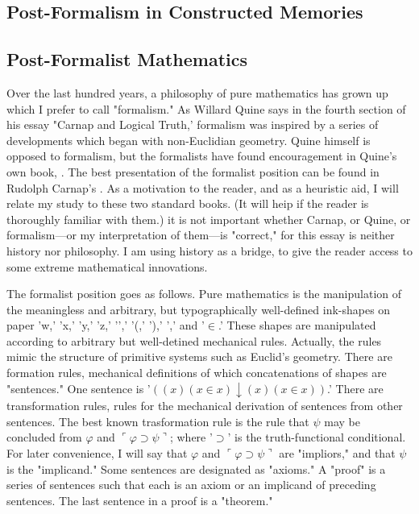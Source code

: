 \documentclass[10pt,twoside]{memoir}
\begin{document}
\begin{enumerate}
{\begin{enumerate}
\section{Post-Formalism in Constructed Memories}
\subsection{Post-Formalist Mathematics}

Over the last hundred years, a philosophy of pure mathematics has 
grown up which I prefer to call "formalism." As Willard Quine says in the 
fourth section of his essay "Carnap and Logical Truth,' formalism was 
inspired by a series of developments which began with non-Euclidian 
geometry. Quine himself is opposed to formalism, but the formalists have 
found encouragement in Quine's own book, . The best 
presentation of the formalist position can be found in Rudolph Carnap's 
. As a motivation to the reader, and 
as a heuristic aid, I will relate my study to these two standard books. (It will 
heip if the reader is thoroughly familiar with them.) it is not important 
whether Carnap, or Quine, or formalism---or my interpretation of them---is 
"correct," for this essay is neither history nor philosophy. I am using history 
as a bridge, to give the reader access to some extreme mathematical 
innovations. 

The formalist position goes as follows. Pure mathematics is the 
manipulation of the meaningless and arbitrary, but typographically 
well-defined ink-shapes on paper 'w,' 'x,' 'y,' 'z,' '{}',' '(,' '),' '\downarrow,' and '$\in$.' 
These shapes are manipulated according to arbitrary but well-detined 
mechanical rules. Actually, the rules mimic the structure of primitive 
systems such as Euclid's geometry. There are formation rules, mechanical 
definitions of which concatenations of shapes are "sentences." One sentence 
is '$((x) (x\in x) \downarrow (x) (x\in x))$.' There are transformation rules, rules for the 
mechanical derivation of sentences from other sentences. The best known 
trasformation rule is the rule that $\psi$ may be concluded from $\varphi$ and 
$\ulcorner \varphi \supset \psi \urcorner$; 
where '$\supset$' is the truth-functional conditional. For later convenience, I will 
say that $\varphi$ and $\ulcorner \varphi \supset \psi \urcorner$ are "impliors," 
and that $\psi$ is the "implicand." 
Some sentences are designated as "axioms." A "proof" is a series of 
sentences such that each is an axiom or an implicand of preceding sentences. 
The last sentence in a proof is a "theorem." 


\end{enumerate}}
\end{enumerate}
\end{document}
